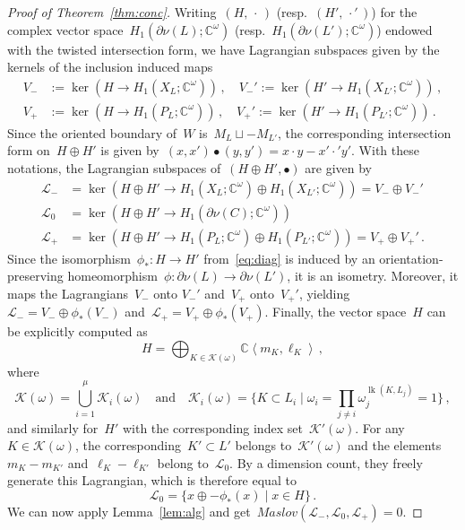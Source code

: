 \documentclass{amsart}
\newcommand{\C}{\mathbb{C}}
\DeclareMathOperator{\lk}{lk}
\theoremstyle{definition}
\theoremstyle{remark}
\begin{document}
\begin{proof}[Proof of Theorem~\ref{thm:conc}]
	Writing~$(H,\,\cdot\,)$ (resp.~$(H',\,\cdot'\,)$) for the complex vector space~$H_1(\partial\nu(L);\C^\omega)$ (resp.~$H_1(\partial\nu(L');\C^\omega)$) endowed with the
	twisted intersection form, we have Lagrangian subspaces given by the kernels
	of the inclusion induced maps
	\begin{align*}
		V_-&:=\ker\left(H\to H_1(X_{L};\C^\omega)\right)\,,\quad V_-':=\ker\left(H'\to H_1(X_{L'};\C^\omega)\right)\,,\\
		V_+&:=\ker\left(H\to H_1(P_{L};\C^\omega)\right)\,,\quad V_+':=\ker\left(H'\to H_1(P_{L'};\C^\omega)\right)\,.
	\end{align*}
	Since the oriented boundary of~$W$ is~$M_L\sqcup -M_{L'}$, the corresponding intersection form on~$H\oplus H'$
	is given by~$(x,x')\bullet (y,y')=x\cdot y-x'\cdot'y'$.
	With these notations, the Lagrangian subspaces of~$(H\oplus H',\bullet)$ are given by
	\begin{align*}
		\mathcal{L}_-&=\ker\left(H\oplus H'\longrightarrow H_1(X_L;\C^\omega)\oplus H_1(X_{L'};\C^\omega)\right)=V_-\oplus V_-'\\
		\mathcal{L}_0&=\ker\left(H\oplus H'\longrightarrow H_1(\partial\nu(C);\C^\omega)\right)\\
		\mathcal{L}_+&=\ker\left(H\oplus H'\longrightarrow H_1(P_L;\C^\omega)\oplus H_1(P_{L'};\C^\omega)\right)=V_+\oplus V_+'\,.
	\end{align*}
	Since the isomorphism~$\phi_*\colon H\to H'$ from~\eqref{eq:diag} is induced by an orientation-preserving homeomorphism~$\phi\colon\partial\nu(L)\to\partial\nu(L')$, it is an isometry.
	Moreover, it maps the Lagrangians~$V_-$
	onto $V_-'$ and~$V_+$
	onto~$V_+'$, yielding~$\mathcal{L}_-=V_-\oplus\phi_*(V_-)$ and~$\mathcal{L}_+=V_+\oplus\phi_*(V_+)$. Finally, the vector space~$H$ can be explicitly computed as
	\[
	H=\bigoplus_{K\in\mathcal{K}(\omega)}\C\left<m_K,\ell_K\right>\,,
	\]
	where
	\[
	\mathcal{K}(\omega)=\bigcup_{i=1}^\mu\mathcal{K}_i(\omega)\quad\text{and}\quad
	\mathcal{K}_i(\omega)=\{K\subset L_i\mid \textstyle{\omega_i=\prod_{j\neq i}\omega_j^{\lk(K,L_j)}=1}\}\,,
	\]
	and similarly for~$H'$ with the corresponding index set~$\mathcal{K}'(\omega)$. For any~$K\in\mathcal{K}(\omega)$,
	the corresponding~$K'\subset L'$ belongs to~$\mathcal{K}'(\omega)$ and the elements~$m_K-m_{K'}$ and~$\ell_K-\ell_{K'}$ belong to~$\mathcal{L}_0$. By a dimension count, they freely generate this Lagrangian, which is therefore
	equal to
	\[
	\mathcal{L}_0=\{x\oplus-\phi_*(x)\mid x\in H\}\,.
	\]
	We can now apply Lemma~\ref{lem:alg} and get~$\mathit{Maslov}(\mathcal{L}_-,\mathcal{L}_0,\mathcal{L}_+)=0$.
\end{proof}
  
\end{document}
